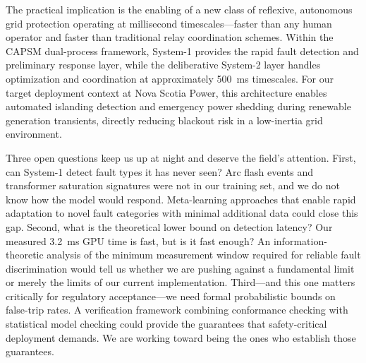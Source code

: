 \documentclass[journal]{IEEEtran}
\begin{document}
The practical implication is the enabling of a new class of reflexive, autonomous grid protection operating at millisecond timescales---faster than any human operator and faster than traditional relay coordination schemes. Within the CAPSM dual-process framework, System-1 provides the rapid fault detection and preliminary response layer, while the deliberative System-2 layer handles optimization and coordination at approximately 500~ms timescales. For our target deployment context at Nova Scotia Power, this architecture enables automated islanding detection and emergency power shedding during renewable generation transients, directly reducing blackout risk in a low-inertia grid environment.

Three open questions keep us up at night and deserve the field's attention. First, can System-1 detect fault types it has never seen? Arc flash events and transformer saturation signatures were not in our training set, and we do not know how the model would respond. Meta-learning approaches that enable rapid adaptation to novel fault categories with minimal additional data could close this gap. Second, what is the theoretical lower bound on detection latency? Our measured 3.2~ms GPU time is fast, but is it fast enough? An information-theoretic analysis of the minimum measurement window required for reliable fault discrimination would tell us whether we are pushing against a fundamental limit or merely the limits of our current implementation. Third---and this one matters critically for regulatory acceptance---we need formal probabilistic bounds on false-trip rates. A verification framework combining conformance checking with statistical model checking could provide the guarantees that safety-critical deployment demands. We are working toward being the ones who establish those guarantees.
\end{document}

